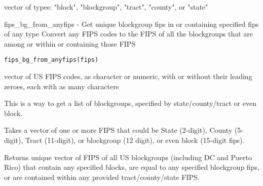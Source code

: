 \documentclass[a4paper]{book}
\begin{document}
%
\begin{Value}
vector of types: "block", "blockgroup", "tract", "county", or "state"
\end{Value}
%
\begin{Examples}
\end{Examples}
%
\begin{Description}\relax
fips\_bg\_from\_anyfips - Get unique blockgroup fips in or containing specified fips of any type
Convert any FIPS codes to the FIPS of all the blockgroups that are
among or within or containing those FIPS
\end{Description}
%
\begin{Usage}
\begin{verbatim}
fips_bg_from_anyfips(fips)
\end{verbatim}
\end{Usage}
%
\begin{Arguments}
\begin{ldescription}
\item[\code{fips}] vector of US FIPS codes, as character or numeric,
with or without their leading zeroes, each with as many characters
\end{ldescription}
\end{Arguments}
%
\begin{Details}\relax
This is a way to get a list of blockgroups, specified by state/county/tract or even block.

Takes a vector of one or more FIPS that could be State (2-digit), County (5-digit),
Tract (11-digit), or blockgroup (12 digit), or even block (15-digit fips).

Returns unique vector of FIPS of all US blockgroups (including DC and Puerto Rico)
that contain any specified blocks, are equal to any specified blockgroup fips,
or are contained within any provided tract/county/state FIPS.
\end{Details}
\end{document}
